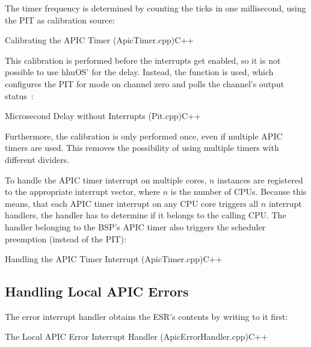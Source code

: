 The timer frequency is determined by counting the ticks in one millisecond, using the PIT as calibration source:

\begin{codeblock}{Calibrating the APIC Timer (ApicTimer.cpp)}{C++}
\end{codeblock}

This calibration is performed before the interrupts get enabled, so it is not possible to use hhuOS'  for the delay.
Instead, the  function is used, which configures the PIT for mode  on channel zero and polls the channel's output status~\autocite{pit}:

\begin{codeblock}{Microsecond Delay without Interrupts (Pit.cpp)}{C++}
\end{codeblock}

Furthermore, the calibration is only performed once, even if multiple APIC timers are used.
This removes the possibility of using multiple timers with different dividers.

To handle the APIC timer interrupt on multiple cores, \(n\)  instances are registered to the appropriate interrupt vector, where \(n\) is the number of CPUs.
Because this means, that each APIC timer interrupt on any CPU core triggers all \(n\) interrupt handlers, the handler has to determine if it belongs to the calling CPU\@.
The handler belonging to the BSP's APIC timer also triggers the scheduler preemption (instead of the PIT):

\begin{codeblock}{Handling the APIC Timer Interrupt (ApicTimer.cpp)}{C++}
\end{codeblock}

\subsection{Handling Local APIC Errors}
\label{subsec:apxhandlingerror}

The error interrupt handler obtains the ESR's contents by writing to it first:

\begin{codeblock}{The Local APIC Error Interrupt Handler (ApicErrorHandler.cpp)}{C++}
\end{codeblock}

